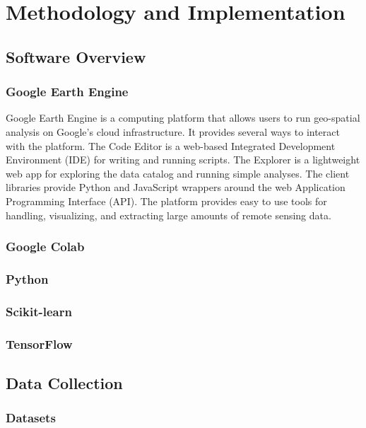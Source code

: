 \documentclass[12pt, a4paper]{report}
\begin{document}
\chapter{Methodology and Implementation}

\section{Software Overview}
\subsection{Google Earth Engine}
Google Earth Engine is a computing platform that allows users to run geo-spatial analysis on Google's cloud infrastructure. It provides several ways to interact with the platform. The Code Editor is a web-based Integrated Development Environment (IDE) for writing and running scripts. The Explorer is a lightweight web app for exploring the data catalog and running simple analyses. The client libraries provide Python and JavaScript wrappers around the web Application Programming Interface (API). The platform provides easy to use tools for handling, visualizing, and extracting large amounts of remote sensing data.\cite{gee1}
\subsection{Google Colab}
\subsection{Python}
\subsection{Scikit-learn}
\subsection{TensorFlow}

\section{Data Collection}
\subsection{Datasets}
\end{document}
